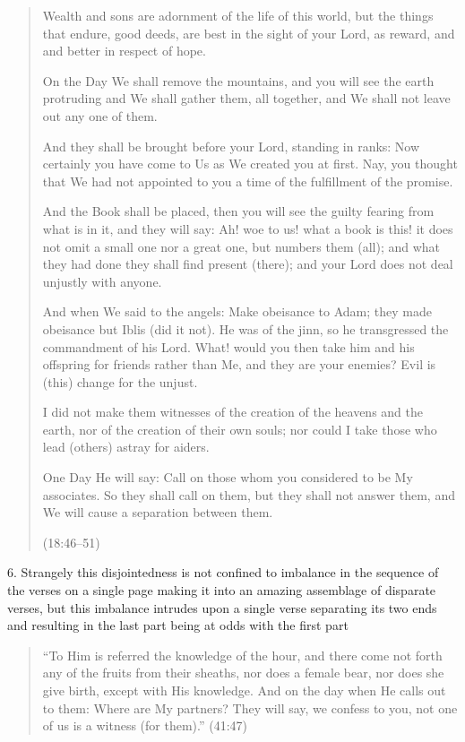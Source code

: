 \documentclass[12pt]{memoir}
\newcommand{\QRef}[1]{{\color{darkblue}#1}}
\begin{document}
\begin{quote}
Wealth and sons are adornment of the life of this world,
but the things that endure, good deeds, are best in the sight of your Lord,
as reward, and  and better in respect of hope.

On the Day We shall remove the mountains,
and you will see the earth protruding and We shall gather them,
all together, and We shall not leave out any one of them.

And they shall be brought before your Lord, standing in ranks:
Now certainly you have come to Us as We created you at first.
Nay, you thought that We had not appointed to you
a time of the fulfillment of the promise.

And the Book shall be placed,
then you will see the guilty fearing from what is in it, and they will say:
Ah! woe to us! what a book is this!
it does not omit a small one nor a great one, but numbers them (all);
and what they had done they shall find present (there);
and your Lord does not deal unjustly with anyone.

And when We said to the angels: Make obeisance to Adam;
they made obeisance but Iblis (did it not).
He was of the jinn, so he transgressed the commandment of his Lord.
What! would you then take him and his offspring for friends rather than Me,
and they are your enemies?
Evil is (this) change for the unjust.

I did not make them witnesses of the creation of the heavens and the earth,
nor of the creation of their own souls;
nor could I take those who lead (others) astray for aiders.

One Day He will say: Call on those whom you considered to be My associates.
So they shall call on them, but they shall not answer them,
and We will cause a separation between them.

(\QRef{18:46–51})
\end{quote}

6. Strangely this disjointedness is not confined to imbalance
in the sequence of the verses on a single page making it
into an amazing assemblage of disparate verses,
but this imbalance intrudes upon a single verse separating its two ends
and resulting in the last part being at odds with the first part

\begin{quote}
“To Him is referred the knowledge of the hour,
and there come not forth any of the fruits from their sheaths,
nor does a female bear, nor does she give birth, except with His knowledge.
And on the day when He calls out to them: Where are My partners?
They will say, we confess to you, not one of us is a witness (for them).”
(\QRef{41:47})
\end{quote}
\end{document}
